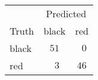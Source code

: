 \begin{tabular}{lcc}
\hline
 & \multicolumn{2}{c}{Predicted} \\ 
Truth  & black & \multicolumn{1}{c}{red} \\ 
\hline
black  & $51$ & $\phantom{0}0$ \\
red  & $\phantom{0}3$ & $46$ \\
\hline 
\end{tabular}
